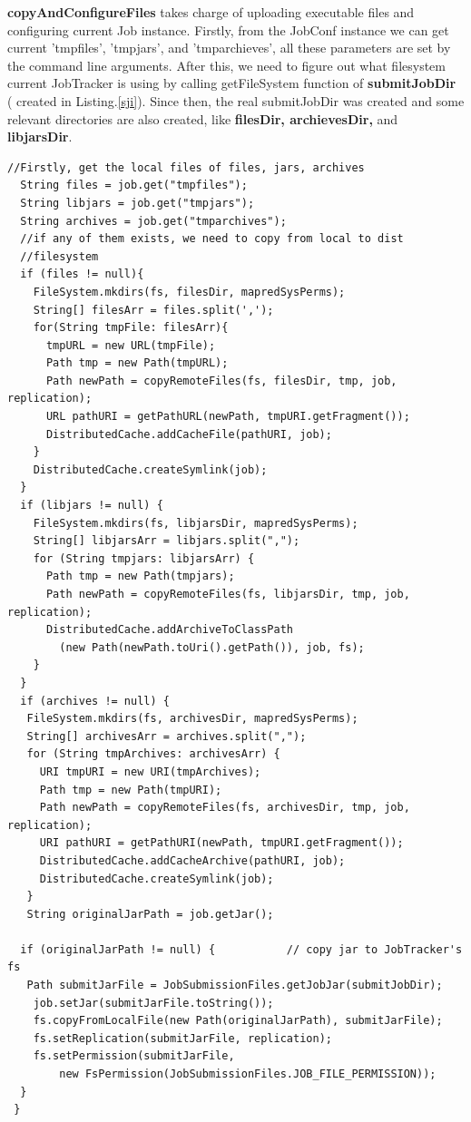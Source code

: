 \documentclass{tufte-book}
\begin{document}
\textbf{copyAndConfigureFiles} takes charge of uploading executable
files and configuring current Job instance. Firstly, from the JobConf
instance we can get current 'tmpfiles', 'tmpjars', and
'tmparchieves', all these parameters are set by the command line
arguments. After this, we need to figure out what filesystem current
JobTracker is using by calling getFileSystem function of
\textbf{submitJobDir} ( created in Listing.\ref{sji}). Since then, the
real submitJobDir was created and some relevant directories are also
created, like \textbf{filesDir, archievesDir,} and
\textbf{libjarsDir}.

\begin{lstlisting}[caption=copyAndConfigureFiles, label=copy]
  //Firstly, get the local files of files, jars, archives
  String files = job.get("tmpfiles");
  String libjars = job.get("tmpjars");
  String archives = job.get("tmparchives");
  //if any of them exists, we need to copy from local to dist
  //filesystem
  if (files != null){
    FileSystem.mkdirs(fs, filesDir, mapredSysPerms);
    String[] filesArr = files.split(',');
    for(String tmpFile: filesArr){
      tmpURL = new URL(tmpFile);
      Path tmp = new Path(tmpURL);
      Path newPath = copyRemoteFiles(fs, filesDir, tmp, job, replication);
      URL pathURI = getPathURL(newPath, tmpURI.getFragment());
      DistributedCache.addCacheFile(pathURI, job);
    }
    DistributedCache.createSymlink(job);
  }
  if (libjars != null) {
    FileSystem.mkdirs(fs, libjarsDir, mapredSysPerms);
    String[] libjarsArr = libjars.split(",");
    for (String tmpjars: libjarsArr) {
      Path tmp = new Path(tmpjars);
      Path newPath = copyRemoteFiles(fs, libjarsDir, tmp, job, replication);
      DistributedCache.addArchiveToClassPath
        (new Path(newPath.toUri().getPath()), job, fs);
    }
  }
  if (archives != null) {
   FileSystem.mkdirs(fs, archivesDir, mapredSysPerms); 
   String[] archivesArr = archives.split(",");
   for (String tmpArchives: archivesArr) {
     URI tmpURI = new URI(tmpArchives);
     Path tmp = new Path(tmpURI);
     Path newPath = copyRemoteFiles(fs, archivesDir, tmp, job, replication);
     URI pathURI = getPathURI(newPath, tmpURI.getFragment());
     DistributedCache.addCacheArchive(pathURI, job);
     DistributedCache.createSymlink(job);
   }
   String originalJarPath = job.getJar();

  if (originalJarPath != null) {           // copy jar to JobTracker's fs
   Path submitJarFile = JobSubmissionFiles.getJobJar(submitJobDir);
    job.setJar(submitJarFile.toString());
    fs.copyFromLocalFile(new Path(originalJarPath), submitJarFile);
    fs.setReplication(submitJarFile, replication);
    fs.setPermission(submitJarFile, 
        new FsPermission(JobSubmissionFiles.JOB_FILE_PERMISSION));
  }
 }
\end{lstlisting}
\end{document}
